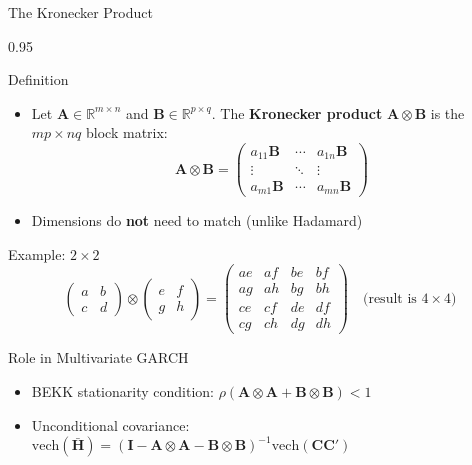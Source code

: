 \documentclass[9pt, aspectratio=169, t]{beamer}
\begin{document}
\begin{frame}{The Kronecker Product}
    \begin{cminipage}{0.95\textwidth}
    \vspace{-3mm}
    {\scriptsize
    \begin{block}{Definition}
        \begin{itemize}\setlength{\itemsep}{0pt}
            \item Let $\mathbf{A} \in \mathbb{R}^{m \times n}$ and $\mathbf{B} \in \mathbb{R}^{p \times q}$. The \textbf{Kronecker product} $\mathbf{A} \otimes \mathbf{B}$ is the $mp \times nq$ block matrix:
            \vspace{-1mm}
            \[
                \mathbf{A} \otimes \mathbf{B} = \begin{pmatrix} a_{11}\mathbf{B} & \cdots & a_{1n}\mathbf{B} \\ \vdots & \ddots & \vdots \\ a_{m1}\mathbf{B} & \cdots & a_{mn}\mathbf{B} \end{pmatrix}
            \]
            \vspace{-3mm}
            \item Dimensions do \textbf{not} need to match (unlike Hadamard)
        \end{itemize}
    \end{block}
    \vspace{-2mm}
    \begin{block}{Example: $2 \times 2$}
        \vspace{-2mm}
        \[
            \begin{pmatrix} a & b \\ c & d \end{pmatrix} \otimes \begin{pmatrix} e & f \\ g & h \end{pmatrix} = \begin{pmatrix} ae & af & be & bf \\ ag & ah & bg & bh \\ ce & cf & de & df \\ cg & ch & dg & dh \end{pmatrix} \quad \text{(result is } 4 \times 4\text{)}
        \]
        \vspace{-3mm}
    \end{block}
    \vspace{-2mm}
    \begin{alertblock}{Role in Multivariate GARCH}
        \begin{itemize}\setlength{\itemsep}{0pt}
            \item BEKK stationarity condition: $\rho(\mathbf{A} \otimes \mathbf{A} + \mathbf{B} \otimes \mathbf{B}) < 1$
            \item Unconditional covariance: $\text{vech}(\bar{\mathbf{H}}) = (\mathbf{I} - \mathbf{A} \otimes \mathbf{A} - \mathbf{B} \otimes \mathbf{B})^{-1}\text{vech}(\mathbf{C}\mathbf{C}')$
        \end{itemize}
    \end{alertblock}
    }
    \end{cminipage}
\end{frame}
\end{document}
